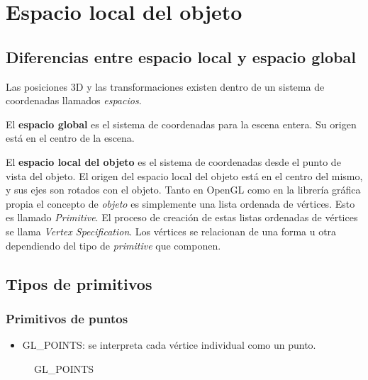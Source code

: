 \chapter{Espacio local del objeto}
\section{Diferencias entre espacio local y espacio global}
Las posiciones 3D y las transformaciones existen dentro de un sistema de coordenadas llamados \textit{espacios}.

El \textbf{espacio global} es el sistema de coordenadas para la escena entera. Su origen está en el centro de la escena.

El \textbf{espacio local del objeto} es el sistema de coordenadas desde el punto de vista del objeto. El origen del espacio local del objeto está en el centro del mismo, y sus ejes son rotados con el objeto. Tanto en OpenGL como en la librería gráfica propia el concepto de \textit{objeto} es simplemente una lista ordenada de vértices. Esto es llamado \textit{Primitive}. El proceso de creación de estas listas ordenadas de vértices se llama \textit{Vertex Specification}. Los vértices se relacionan de una forma u otra dependiendo del tipo de \textit{primitive} que componen. 

\newpage

\section{Tipos de primitivos}

\subsection{Primitivos de puntos}
\begin{itemize}
\item{GL\_POINTS: se interpreta cada vértice individual como un punto.}

\end{itemize}

\begin{figure} [h]
  \centering
  \caption{GL\_POINTS}
\end{figure}

